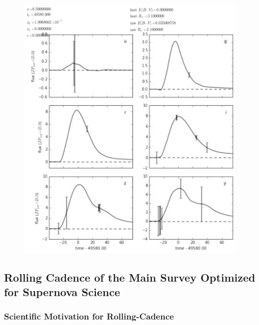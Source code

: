 \begin{figure}[tbh!]
\includegraphics[angle=0,width=0.99\hsize:,clip]{figs/supernova/LCfield00Decp18RA358.pdf}
\caption{}
\label{fig:SNIaLCDecp18}
\end{figure}



\subsection{Rolling Cadence of the Main Survey Optimized for Supernova Science}
\subsubsection{ Scientific Motivation for Rolling-Cadence}

